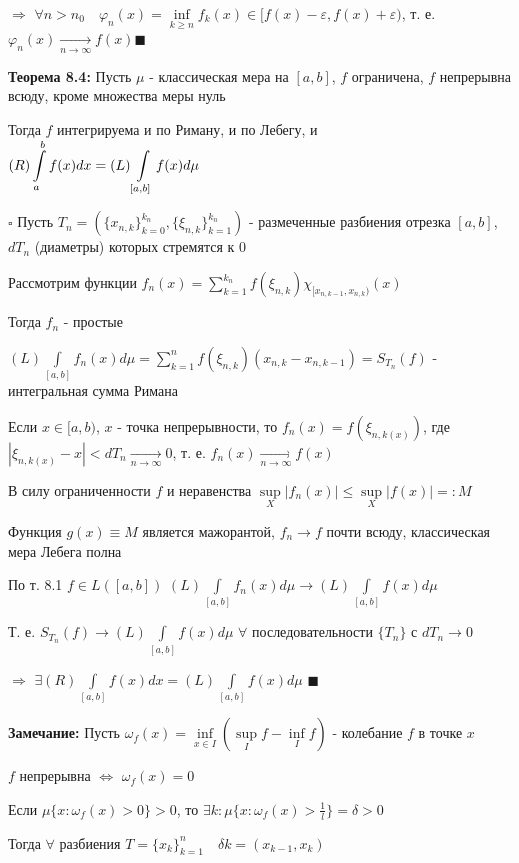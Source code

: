 \documentclass[a4paper]{report}
\newcommand*{\hm}[1]{#1\nobreak\discretionary{}%
            {\hbox{$\mathsurround=0pt #1$}}{}}
\begin{document}
\noindent$\Rightarrow$ $\forall n>n_0\quad\varphi_n(x)=\inf\limits_{k\ge n}f_k(x)\in[f(x)-\varepsilon,f(x)+\varepsilon)$, т. е. $\varphi_n(x)\xrightarrow[n\to\infty]{}f(x)\blacksquare$
\bigskip

\noindent\textbf{Теорема 8.4:} Пусть $\mu$ - классическая мера на $[a,b]$, $f$ ограничена, $f$ непрерывна всюду, кроме множества меры нуль

Тогда $f$ интегрируема и по Риману, и по Лебегу, и $(R)\displaystyle\int\limits_a^b f(x)dx\hm=(L)\displaystyle\int\limits_{[a,b]}f(x)d\mu$

\noindent $\square$ Пусть $T_n=\left(\{x_{n,k}\}_{k=0}^{k_n},\{\xi_{n,k}\}_{k=1}^{k_n}\right)$ - размеченные разбиения отрезка $[a,b]$, $dT_n$ (диаметры) которых стремятся к 0

Рассмотрим функции $f_n(x)=\sum\limits_{k=1}^{k_n} f(\xi_{n,k})\chi_{[x_{n,k-1},x_{n,k})}(x)$

Тогда $f_n$ - простые

$(L)\displaystyle\int\limits_{[a,b]}f_n(x)d\mu=\sum\limits_{k=1}^nf(\xi_{n,k})(x_{n,k}-x_{n,k-1})=S_{T_n}(f)$ - интегральная сумма Римана

Если $x\in[a,b)$, $x$ - точка непрерывности, то $f_n(x)=f(\xi_{n,k(x)})$, где $|\xi_{n,k(x)}-x|<dT_n\xrightarrow[n\to\infty]{}0$, т. е. $f_n(x)\xrightarrow[n\to\infty]{}f(x)$

В силу ограниченности $f$ и неравенства $\sup\limits_X|f_n(x)|\le\sup\limits_X|f(x)|=:M$

Функция $g(x)\equiv M$ является мажорантой, $f_n\to f$ почти всюду, классическая мера Лебега полна

По т. 8.1 $f\in L([a,b])$ $(L)\displaystyle\int\limits_{[a,b]}f_n(x)d\mu\to(L)\displaystyle\int\limits_{[a,b]}f(x)d\mu$

Т. е. $S_{T_n}(f)\to(L)\displaystyle\int\limits_{[a,b]}f(x)d\mu$ $\forall$ последовательности $\{T_n\}$ с $dT_n\to0$

$\Rightarrow$ $\exists(R)\displaystyle\int\limits_{[a,b]}f(x)dx=(L)\displaystyle\int\limits_{[a,b]}f(x)d\mu$ $\blacksquare$
\bigskip

\noindent\textbf{Замечание:} Пусть $\omega_f(x)=\inf\limits_{x\in I}(\sup\limits_I f-\inf\limits_I f)$ - колебание $f$ в точке $x$

$f$ непрерывна $\Leftrightarrow$ $\omega_f(x)=0$

Если $\mu\{x\colon\omega_f(x)>0\}>0$, то $\exists k\colon\mu\{x\colon\omega_f(x)>\frac1l\}=\delta>0$

Тогда $\forall$ разбиения $T=\{x_k\}_{k=1}^n\quad \delta k=(x_{k-1},x_k)$
\end{document}
